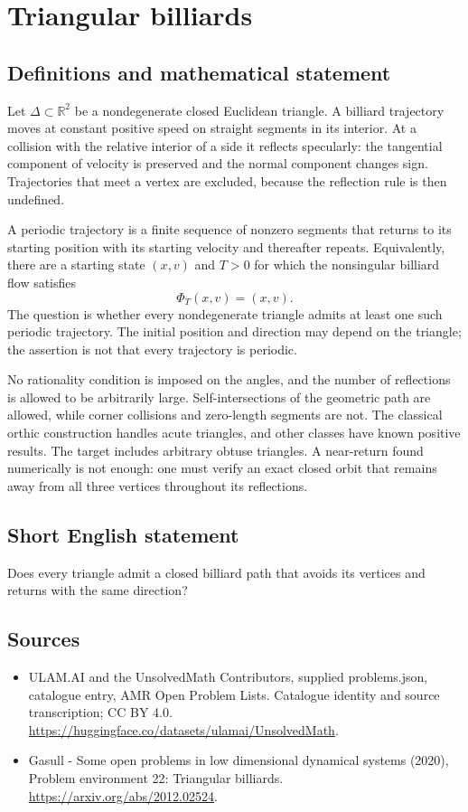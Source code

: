 \documentclass[11pt,a4paper]{article}
\begin{document}
\section*{Triangular billiards}\label{statement}

\subsection{Definitions and mathematical statement}
Let $\Delta\subset\mathbb R^2$ be a nondegenerate closed Euclidean triangle.
A billiard trajectory moves at constant positive speed on straight
segments in its interior. At a collision with the relative interior of a
side it reflects specularly: the tangential component of velocity is
preserved and the normal component changes sign. Trajectories that meet
a vertex are excluded, because the reflection rule is then undefined.

A periodic trajectory is a finite sequence of nonzero segments that
returns to its starting position with its starting velocity and thereafter
repeats. Equivalently, there are a starting state $(x,v)$ and $T>0$ for
which the nonsingular billiard flow satisfies
\[
 \Phi_T(x,v)=(x,v).
\]
The question is whether every nondegenerate triangle admits at least one
such periodic trajectory. The initial position and direction may depend
on the triangle; the assertion is not that every trajectory is periodic.

No rationality condition is imposed on the angles, and the number of
reflections is allowed to be arbitrarily large. Self-intersections of the
geometric path are allowed, while corner collisions and zero-length
segments are not. The classical orthic construction handles acute
triangles, and other classes have known positive results. The target
includes arbitrary obtuse triangles. A near-return found numerically is
not enough: one must verify an exact closed orbit that remains away from
all three vertices throughout its reflections.
\subsection{Short English statement}
Does every triangle admit a closed billiard path that avoids its vertices and returns with the same direction?
\subsection{Sources}
\begin{itemize}
\item[S1] ULAM.AI and the UnsolvedMath Contributors, supplied problems.json, catalogue entry, AMR Open Problem Lists. Catalogue identity and source transcription; CC BY 4.0.
\url{https://huggingface.co/datasets/ulamai/UnsolvedMath}.
\item[S2] Gasull - Some open problems in low dimensional dynamical systems (2020), Problem environment 22: Triangular billiards. 
\url{https://arxiv.org/abs/2012.02524}.
\end{itemize}
\end{document}

